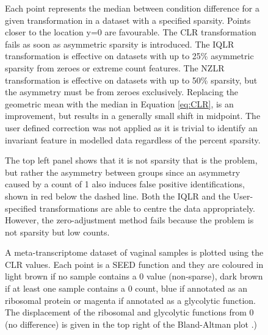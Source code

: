 \documentclass{bmcart}
\def\texttt{[image: ]}
\begin{document}
\begin{backmatter}
\begin{figure}[h!]
\caption{ Each point represents the median between condition difference for a given transformation in a dataset with a specified sparsity. Points closer to the location y=0 are favourable. The CLR transformation fails as soon as asymmetric sparsity is introduced. The IQLR  transformation is effective on datasets with up to 25\% asymmetric sparsity from zeroes or extreme count features. The NZLR transformation is effective on datasets with up to 50\% sparsity, but the asymmetry must be from zeroes exclusively. Replacing the geometric mean with the median in Equation \ref{eq:CLR}, is an improvement, but results in a generally small shift in midpoint. The user defined correction was not applied as it is trivial to identify an invariant feature in modelled data regardless of the percent sparsity.}
\label{Fig:failure}
\end{figure}

\begin{figure}[!t]
\caption{ The top left panel shows that it is not sparsity that is the problem, but rather the asymmetry  between groups since an asymmetry caused by a count of 1 also induces false positive identifications, shown in red below the dashed line. Both the IQLR and the User-specified transformations are able to centre the data appropriately. However, the zero-adjustment method fails because the problem is not sparsity but low counts.}
\label{Fig:ones}
\end{figure}

\begin{figure}[h!]
\caption{ A meta-transcriptome dataset of vaginal samples is plotted using the CLR values. Each point is a SEED function \cite{Mitra:2011} and they are coloured in light brown if no sample contains a 0 value (non-sparse), dark brown if at least one sample contains a 0 count, blue if annotated as an ribosomal protein or magenta if annotated as a glycolytic function. The displacement of the ribosomal and glycolytic functions from 0 (no difference) is given in the top right of the Bland-Altman plot \cite{altman:1983}.) }
\label{Fig:bv}
\end{figure}



\end{backmatter}
\end{document}
